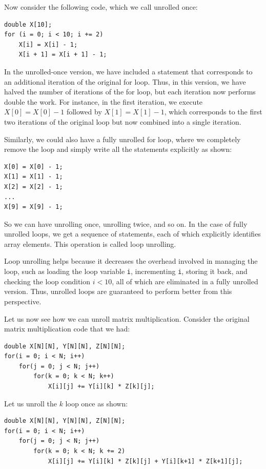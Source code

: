 \documentclass[12pt]{book}
\begin{document}
Now consider the following code, which we call unrolled once:
\begin{lstlisting}[style=cppstyle,  caption = Unrolled Once]
double X[10];
for (i = 0; i < 10; i += 2)
    X[i] = X[i] - 1;
    X[i + 1] = X[i + 1] - 1;
\end{lstlisting}

In the unrolled-once version, we have included a statement that corresponds to an additional iteration of the original for loop. Thus, in this version, we have halved the number of iterations of the for loop, but each iteration now performs double the work. For instance, in the first iteration, we execute $X[0] = X[0] - 1$ followed by $X[1] = X[1] - 1$, which corresponds to the first two iterations of the original loop but now combined into a single iteration.

Similarly, we could also have a fully unrolled for loop, where we completely remove the loop and simply write all the statements explicitly as shown:
\begin{lstlisting}[style=cppstyle]
X[0] = X[0] - 1;
X[1] = X[1] - 1;
X[2] = X[2] - 1;
...
X[9] = X[9] - 1;
\end{lstlisting}

So we can have unrolling once, unrolling twice, and so on. In the case of fully unrolled loops, we get a sequence of statements, each of which explicitly identifies array elements. This operation is called loop unrolling.

Loop unrolling helps because it decreases the overhead involved in managing the loop, such as loading the loop variable \texttt{i}, incrementing \texttt{i}, storing it back, and checking the loop condition $i < 10$, all of which are eliminated in a fully unrolled version. Thus, unrolled loops are guaranteed to perform better from this perspective.

Let us now see how we can unroll matrix multiplication. Consider the original matrix multiplication code that we had:
\begin{lstlisting}[style=cppstyle]
double X[N][N], Y[N][N], Z[N][N];
for(i = 0; i < N; i++)
    for(j = 0; j < N; j++)
        for(k = 0; k < N; k++)
            X[i][j] += Y[i][k] * Z[k][j];
\end{lstlisting}

Let us unroll the $k$ loop once as shown:
\begin{lstlisting}[style=cppstyle]
double X[N][N], Y[N][N], Z[N][N];
for(i = 0; i < N; i++)
    for(j = 0; j < N; j++)
        for(k = 0; k < N; k += 2)
            X[i][j] += Y[i][k] * Z[k][j] + Y[i][k+1] * Z[k+1][j];
\end{lstlisting}
\end{document}
